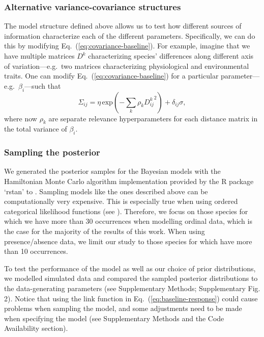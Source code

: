 \documentclass[11pt, a4paper]{article}
\begin{document}
\subsubsection*{Alternative variance-covariance structures}
The model structure defined above allows us to test how different sources of information characterize each of the different parameters. Specifically, we can do this by modifying Eq.~(\ref{eq:covariance-baseline}). For example, imagine that we have multiple matrices $D^k$ characterizing species' differences along different axis of variation---e.g.~two matrices characterizing physiological and environmental traits. One can modify Eq.~(\ref{eq:covariance-baseline}) for a particular parameter---e.g.~$\beta_{i}$---such that
\begin{equation} 
\Sigma_{ij} = \eta\,\text{exp}\left(-\sum_k\rho_{k} {D^{k}_{ij}}^2\right) + \delta_{ij} \sigma ,
\label{eq:covariance-complex}
\end{equation}
where now $\rho_{k}$ are separate relevance hyperparameters for each distance matrix in the total variance of $\beta_i$.

\subsubsection*{Sampling the posterior}
We generated the posterior samples for the Bayesian models with the Hamiltonian Monte Carlo algorithm implementation provided by the R package `rstan' to \citep{standevelopentteamRStanInterfaceStan2021}. Sampling models like the ones described above can be computationally very expensive. This is especially true when using ordered categorical likelihood functions (see \citealt{standevelopmentteamStanModelingLanguage2021}). Therefore, we focus on those species for which we have more than 30 occurrences when modelling ordinal data, which is the case for the majority of the results of this work. When using presence/absence data, we limit our study to those species for which have more than 10 occurrences. 

To test the performance of the model as well as our choice of prior distributions, we modelled simulated data and compared the sampled posterior distributions to the data-generating parameters (see Supplementary Methods; Supplementary Fig. 2). Notice that using the link function in Eq.~(\ref{eq:baseline-response}) could cause problems when sampling the model, and some adjustments need to be made when specifying the model (see Supplementary Methods and the Code Availability section). 
\end{document}
